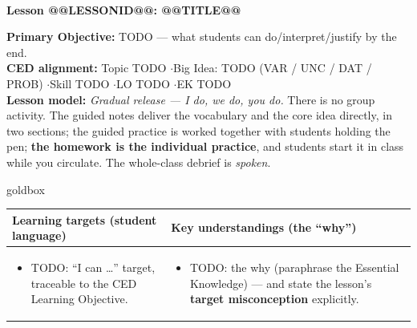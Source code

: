\documentclass[10pt]{article}
\makeatletter
\newcommand{\LessonNumberName}{Lesson @@LESSONID@@: @@TITLE@@}
\makeatother
\begin{document}
\begin{center}
    {\Large\bfseries \CourseName \\
    {\small\bfseries \UnitNumberName \LessonNumberName}}
\end{center}

\begin{tcolorbox}[colback=sky, colframe=navy, boxrule=0.9pt, arc=2mm,
    left=2mm, right=2mm, top=1.5mm, bottom=1.5mm]
    \textbf{Primary Objective:} TODO --- what students can do/interpret/justify by the end.
    \\[2pt]
    \textbf{CED alignment:} Topic TODO \quad$\cdot$\quad Big Idea: TODO (VAR / UNC / DAT / PROB)
    \quad$\cdot$\quad Skill TODO \quad$\cdot$\quad LO TODO \quad$\cdot$\quad EK TODO
    \\[2pt]
    \textbf{Lesson model:} \emph{Gradual release --- I do, we do, you do.} There is no group
    activity. The guided notes deliver the vocabulary and the core idea directly, in two
    sections; the guided practice is worked together with students holding the pen;
    \textbf{the homework is the individual practice}, and students start it in class while you
    circulate. The whole-class debrief is \emph{spoken}.
\end{tcolorbox}

\renewcommand{\arraystretch}{1.4}
\begin{skillbox}{goldbox}
\begin{tabularx}{\linewidth}{@{}X|X@{}}
\textbf{Learning targets (student language)} & \textbf{Key understandings (the ``why'')} \\[2pt]
\hline
\vspace{-6pt}
\begin{itemize}[leftmargin=1.1em, nosep, after=\vspace{2pt}]
  \item TODO: ``I can \dots'' target, traceable to the CED Learning Objective.
\end{itemize}
&
\vspace{-6pt}
\begin{itemize}[leftmargin=1.1em, nosep, after=\vspace{2pt}]
  \item TODO: the why (paraphrase the Essential Knowledge) --- and state the lesson's
        \textbf{target misconception} explicitly.
\end{itemize}
\end{tabularx}
\end{skillbox}
\end{document}
